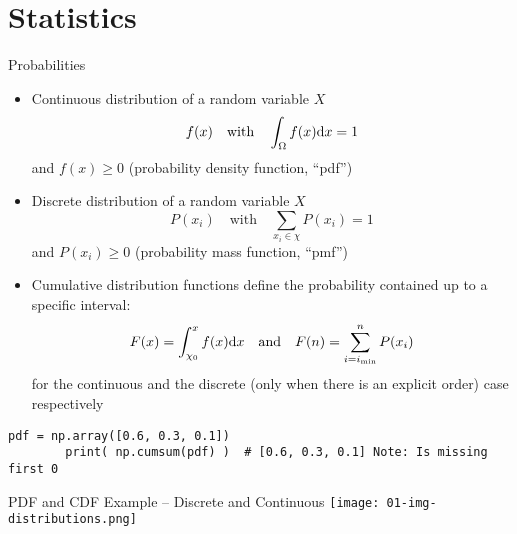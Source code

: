   \section{Statistics}
  \begin{frame}[fragile]{Probabilities}
    \begin{itemize}
      \item Continuous distribution of a random variable $X$
        \begin{equation*}
          f(x) \quad\text{with}\quad \int_\Omega f(x) \mathrm{d}x = 1
        \end{equation*}
        and $f(x) \geq 0$ (probability density function, \enquote{pdf})
      \item Discrete distribution of a random variable $X$
        \begin{equation*}
          P(x_i) \quad\text{with}\quad \sum_{x_i\in\chi} P(x_i) = 1
        \end{equation*}
        and $P(x_i) \geq 0$ (probability mass function, \enquote{pmf})
      \item Cumulative distribution functions define the probability contained up to a specific interval:
      \begin{equation*}
        F(x) = \int_{\chi_0}^x f(x) \mathrm{d}x
        \quad \text{and} \quad
        F(n) = \sum_{i=i_\text{min}}^n P(x_i)
      \end{equation*}
      for the continuous and the discrete (only when there is an explicit order) case respectively
    \end{itemize}
    \begin{mdframed}
      \begin{lstlisting}[style=dark, gobble=8, title=\lsttitlelight{Cumulative distribution function for discrete PDF}]
        pdf = np.array([0.6, 0.3, 0.1])
        print( np.cumsum(pdf) )  # [0.6, 0.3, 0.1] Note: Is missing first 0
      \end{lstlisting}
    \end{mdframed}
  \end{frame}

  \begin{frame}{PDF and CDF Example -- Discrete and Continuous}
    \texttt{[image: 01-img-distributions.png]}
  \end{frame}

